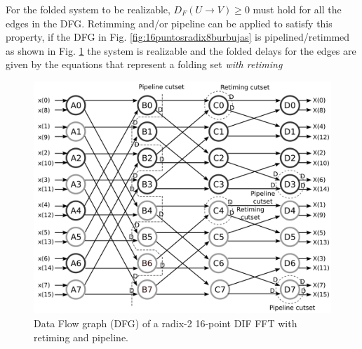 \documentclass[journal,comsoc]{IEEEtran}
\begin{document}
For the folded system to be realizable, $D_F(U\to V)\geq0$ must hold for all the edges in the DFG. Retimming and/or pipeline can be applied to satisfy this property, if the DFG in Fig. \ref{fig:16puntosradix8burbujas} is pipelined/retimmed as shown in Fig. \ref{fig:dfg_16_ret} the system is realizable and the folded delays for the edges are given by the equations that represent a folding set \textit{with retiming}
\begin{figure}[h!]
\centering
\includegraphics[width=\linewidth]{Diagramas/16points_dfg_ret.png}
\caption{Data Flow graph (DFG) of a radix-2 16-point DIF FFT with retiming and pipeline.}
\label{fig:dfg_16_ret}
\end{figure}
\end{document}
